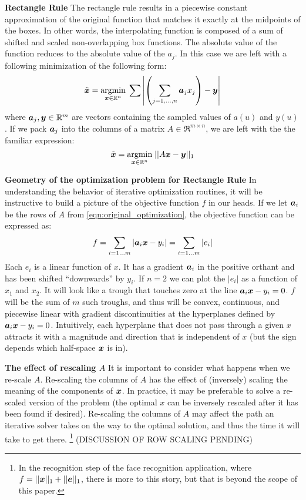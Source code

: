 \documentclass[12pt,journal,draftcls,letterpaper,onecolumn]{IEEEtran}
\begin{document}
{\bf Rectangle Rule} The rectangle rule results in a piecewise constant approximation of the original function that matches it exactly at the midpoints of the boxes. In other words, the interpolating function is composed of a sum of shifted and scaled non-overlapping box functions.  The absolute value of the function reduces to the absolute value of the $a_j$.  In this case we are left with a following minimization of the following form:
\begin{equation}\label{eqn:discrete1DBox}
\tilde{{\boldsymbol{x}}} = {\hbox{$\underset{{\boldsymbol{x}}\in \mathbb R^n}{\mbox{argmin}}\;$}} \sum{ \left|\left(\sum_{j=1,\ldots,n} \boldsymbol{a}_j x_j\right) - {\boldsymbol{y}}\right|}
\end{equation}
where $\boldsymbol{a}_j, {\boldsymbol{y}} \in \mathbb R^m$ are vectors containing the sampled values of $a(u)$ and $y(u)$.  If we pack $\boldsymbol{a}_j$ into the columns of a matrix $A \in \Re^{m \times n}$, we are left with the the familiar expression:
\begin{equation}\label{eqn:original_optimization}
\tilde{{\boldsymbol{x}}} = {\hbox{$\underset{{\boldsymbol{x}}\in \mathbb R^n}{\mbox{argmin}}\;$}} || A {\boldsymbol{x}} - {\boldsymbol{y}} ||_1
\end{equation}

{\bf Geometry of the optimization problem for Rectangle Rule}  In understanding the behavior of iterative optimization routines, it will be instructive to build a picture of the objective function $f$ in our heads.  If we let $\boldsymbol{a}_i$ be the rows of $A$ from \ref{eqn:original_optimization}, the objective function can be expressed as:
\begin{equation}
f = \sum_{i=1\ldots m}| \boldsymbol{a}_i {\boldsymbol{x}} - y_i | = \sum_{i=1\ldots m} |e_i|
\end{equation}
Each $e_i$ is a linear function of $x$. It has a gradient $\boldsymbol{a}_i$ in the positive orthant and has been shifted ``downwards'' by $y_i$.  If $n=2$ we can plot the $|e_i|$ as a function of $x_1$ and $x_2$.  It will look like a trough that touches zero at the line $\boldsymbol{a}_i {\boldsymbol{x}} - y_i=0$.  $f$ will be the sum of $m$ such troughs, and thus will be convex, continuous, and piecewise linear with gradient discontinuities at the hyperplanes defined by $\boldsymbol{a}_i {\boldsymbol{x}} - y_i=0$. Intuitively, each hyperplane that does not pass through a given $x$ attracts it with a magnitude and direction that is independent of $x$ (but the sign depends which half-space ${\boldsymbol{x}}$ is in).

{\bf The effect of rescaling $A$} It is important to consider what happens when we re-scale $A$.  Re-scaling the columns of $A$ has the effect of (inversely) scaling the meaning of the components of ${\boldsymbol{x}}$.  In practice, it may be preferable to solve a re-scaled version of the problem (the optimal $x$ can be inversely rescaled after it has been found if desired).  Re-scaling the columns of $A$ may affect the path an iterative solver takes on the way to the optimal solution, and thus the time it will take to get there.  \footnote{In the recognition step of the face recognition application, where $f = ||{\boldsymbol{x}}||_1 + ||\boldsymbol{e}||_1$, there is more to this story, but that is beyond the scope of this paper.}  (DISCUSSION OF ROW SCALING PENDING)
\end{document}
